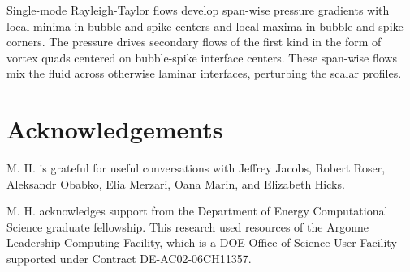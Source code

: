 Single-mode Rayleigh-Taylor flows develop span-wise pressure gradients with local minima in bubble and spike centers and local maxima in bubble and spike corners.
The pressure drives secondary flows of the first kind in the form of vortex quads centered on bubble-spike interface centers.
These span-wise flows mix the fluid across otherwise laminar interfaces, perturbing the scalar profiles.

\section{Acknowledgements}

M. H. is grateful for useful conversations with Jeffrey Jacobs, Robert Roser, Aleksandr Obabko, Elia Merzari, Oana Marin, and Elizabeth Hicks.

M. H. acknowledges support from the Department of Energy Computational Science graduate fellowship.
This research used resources of the Argonne Leadership Computing Facility, which is a DOE Office of Science User Facility supported under Contract DE-AC02-06CH11357.

